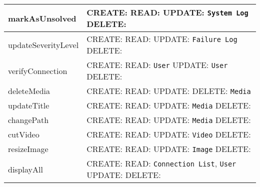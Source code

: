 \begin{table}[H]
	\centering
	\begin{tabular}{|p{5cm}|p{7cm}|}
		\hline
		markAsUnsolved &
		CREATE:\newline
		READ: \newline
		UPDATE: \texttt{System Log}\newline
		DELETE: \\
		\hline
		updateSeverityLevel &
		CREATE:\newline
		READ: \newline
		UPDATE: \texttt{Failure Log}\newline
		DELETE: \\
		\hline
		verifyConnection &
		CREATE: \newline
		READ: \texttt{User}\newline
		UPDATE: \texttt{User}\newline
		DELETE: \\
		\hline
		deleteMedia &
		CREATE: \newline
		READ:  \newline
		UPDATE: \newline
		DELETE: \texttt{Media} \\
		\hline
		updateTitle &
		CREATE: \newline
		READ:  \newline
		UPDATE: \texttt{Media} \newline
		DELETE:  \\
		\hline
		changePath &
		CREATE: \newline
		READ:  \newline
		UPDATE: \texttt{Media} \newline
		DELETE:  \\
		\hline
		cutVideo &
		CREATE: \newline
		READ:  \newline
		UPDATE: \texttt{Video} \newline
		DELETE:  \\
		\hline
		resizeImage &
		CREATE: \newline
		READ:  \newline
		UPDATE: \texttt{Image} \newline
		DELETE:  \\
		\hline
		displayAll &
		CREATE: \newline
		READ: \texttt{Connection List}, \texttt{User}\newline
		UPDATE: \newline
		DELETE: \\
		\hline
	\end{tabular}
\end{table}
